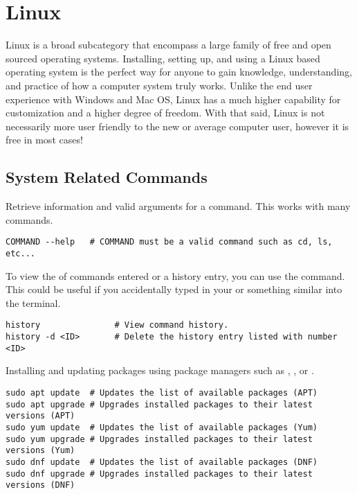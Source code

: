 \chapter{Linux}
\thispagestyle{fancy}
\lstset{language=Bash, style=terminalstyle}

Linux is a broad subcategory that encompass a large family of free and open sourced operating systems. Installing, setting up, and using a Linux based operating system is the perfect way for anyone to gain knowledge, understanding, and practice of how a computer system truly works. Unlike the end user experience with Windows and Mac OS, Linux has a much higher capability for customization and a higher degree of freedom. With that said, Linux is not necessarily more user friendly to the new or average computer user, however it is free in most cases!








\section{System Related Commands}

Retrieve information and valid arguments for a command. This works with many commands.
\begin{lstlisting}
COMMAND --help   # COMMAND must be a valid command such as cd, ls, etc...
\end{lstlisting}

To view the  of commands entered or  a history entry, you can use the  command. This could be useful if you accidentally typed in your  or something similar into the terminal.
\begin{lstlisting}
history               # View command history.
history -d <ID>       # Delete the history entry listed with number <ID>
\end{lstlisting}

Installing and updating packages using package managers such as , , or .
\begin{lstlisting}
sudo apt update  # Updates the list of available packages (APT)
sudo apt upgrade # Upgrades installed packages to their latest versions (APT)
sudo yum update  # Updates the list of available packages (Yum)
sudo yum upgrade # Upgrades installed packages to their latest versions (Yum)
sudo dnf update  # Updates the list of available packages (DNF)
sudo dnf upgrade # Upgrades installed packages to their latest versions (DNF)
\end{lstlisting}

